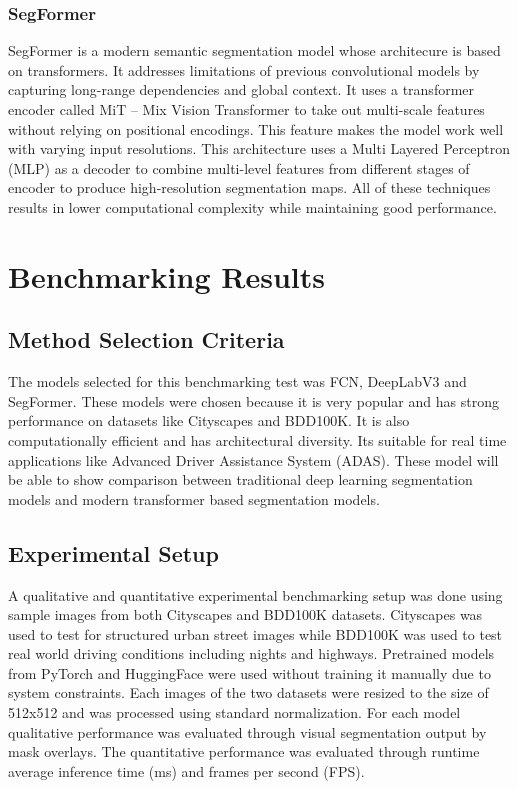 \documentclass[10pt,journal,compsoc]{IEEEtran}
\begin{document}
\subsubsection{SegFormer}
SegFormer is a modern semantic segmentation model whose architecure is based on transformers. It addresses limitations of previous convolutional models by capturing long-range dependencies and global context. It uses a transformer encoder called MiT – Mix Vision Transformer to take out multi-scale features without relying on positional encodings. This feature makes the model work well with varying input resolutions. This architecture uses a Multi Layered Perceptron (MLP) as a decoder to combine multi-level features from different stages of encoder to produce high-resolution segmentation maps. All of these techniques results in lower computational complexity while maintaining good performance.

\section{Benchmarking Results}
\subsection{Method Selection Criteria}
The models selected for this benchmarking test was FCN, DeepLabV3 and SegFormer. These models were chosen because it is very popular and has strong performance on datasets like Cityscapes and BDD100K. It is also computationally efficient and has architectural diversity. Its suitable for real time applications like Advanced Driver Assistance System (ADAS). These model will be able to show comparison between traditional deep learning segmentation models and modern transformer based segmentation models.

\subsection{Experimental Setup}
A qualitative and quantitative experimental benchmarking setup was done using sample images from both Cityscapes and BDD100K datasets. Cityscapes was used to test for structured urban street images while BDD100K was used to test real world driving conditions including nights and highways. Pretrained models from PyTorch and HuggingFace were used without training it manually due to system constraints. Each images of the two datasets were resized to the size of 512x512 and was processed using standard normalization. For each model qualitative performance was evaluated through visual segmentation output by mask overlays. The quantitative performance was evaluated through runtime average inference time (ms) and frames per second (FPS).
\end{document}
